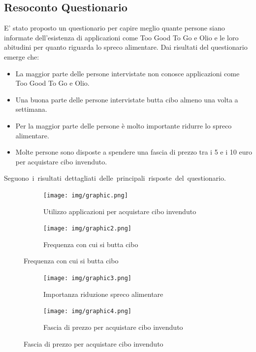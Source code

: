 \documentclass{article}
\begin{document}
\subsection{Resoconto Questionario}
E' stato proposto un questionario per capire meglio quante persone siano informate dell'esistenza di applicazioni come Too Good To Go e Olio e le loro abitudini per quanto riguarda lo spreco alimentare.
\newline
Dai risultati del questionario emerge che:
\begin{itemize}
    \item La maggior parte delle persone intervistate non conosce applicazioni come Too Good To Go e Olio.
    \item Una buona parte delle persone intervistate butta cibo almeno una volta a settimana.
    \item Per la maggior parte delle persone è molto importante ridurre lo spreco alimentare.
    \item Molte persone sono disposte a spendere una fascia di prezzo tra i 5 e i 10 euro per acquistare cibo invenduto.
\end{itemize}

\hbox{Seguono i risultati dettagliati delle principali risposte del questionario.}

\begin{figure}[H]
    \centering
    \begin{subfigure}{0.40\textwidth}
        \centering
        \texttt{[image: img/graphic.png]}
        \caption{Utilizzo applicazioni per acquistare cibo invenduto}
    \end{subfigure}
    \hfill
    \begin{subfigure}{0.40\textwidth}
        \centering
        \texttt{[image: img/graphic2.png]}
        \caption{Frequenza con cui si butta cibo}
    \end{subfigure}
\end{figure}

\begin{figure}[H]
    \centering
    \begin{subfigure}{0.40\textwidth}
        \centering
        \texttt{[image: img/graphic3.png]}
        \caption{Importanza riduzione spreco alimentare}
    \end{subfigure}
    \hfill
    \begin{subfigure}{0.40\textwidth}
        \centering
        \texttt{[image: img/graphic4.png]}
        \caption{Fascia di prezzo per acquistare cibo invenduto}
    \end{subfigure}
\end{figure}
\end{document}
